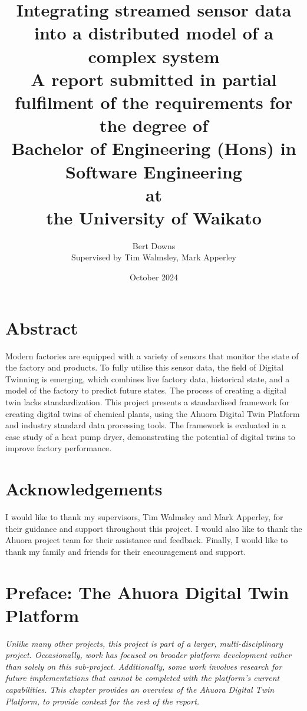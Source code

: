 \documentclass[12pt]{report}
\title{Integrating streamed sensor data into a distributed model of a complex system \\
\large{A report submitted in partial fulfilment of the requirements for the degree of \\
\textbf{Bachelor of Engineering (Hons) in Software Engineering} \\
at \\
\textbf{the University of Waikato}
}}
\author{Bert Downs  \\ 
Supervised by Tim Walmsley, Mark Apperley }
\date{October 2024}
\begin{document}

\maketitle


\chapter*{Abstract}

Modern factories are equipped with a variety of sensors that monitor the state of the factory and products. To fully utilise this sensor data, the field of Digital Twinning is emerging, which combines live factory data, historical state, and a model of the factory to predict future states. The process of creating a digital twin lacks standardization. This project presents a standardised framework for creating digital twins of chemical plants, using the Ahuora Digital Twin Platform and industry standard data processing tools. The framework is evaluated in a case study of a heat pump dryer, demonstrating the potential of digital twins to improve factory performance.


\chapter*{Acknowledgements}

I would like to thank my supervisors, Tim Walmsley and Mark Apperley, for their guidance and support throughout this project. I would also like to thank the Ahuora project team for their assistance and feedback. Finally, I would like to thank my family and friends for their encouragement and support.

\tableofcontents

\listoffigures

\listoftables

\newpage


\chapter{Preface: The Ahuora Digital Twin Platform}


\textit{ Unlike many other projects, this project is part of a larger, multi-disciplinary project. Occasionally, work has focused on broader platform development rather than solely on this sub-project. Additionally, some work involves research for future implementations that cannot be completed with the platform's current capabilities. This chapter provides an overview of the Ahuora Digital Twin Platform, to provide context for the rest of the report.}
\end{document}
